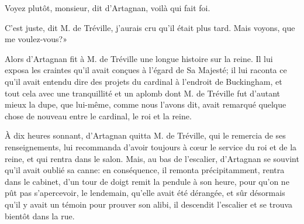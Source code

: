 \speak  Voyez plutôt, monsieur, dit d'Artagnan, voilà qui fait foi. 

\speak  C'est juste, dit M. de Tréville, j'aurais cru qu'il était plus tard. Mais voyons, que me voulez-vous?» 

Alors d'Artagnan fit à M. de Tréville une longue histoire sur la reine. Il lui exposa les craintes qu'il avait conçues à l'égard de Sa Majesté; il lui raconta ce qu'il avait entendu dire des projets du cardinal à l'endroit de Buckingham, et tout cela avec une tranquillité et un aplomb dont M. de Tréville fut d'autant mieux la dupe, que lui-même, comme nous l'avons dit, avait remarqué quelque chose de nouveau entre le cardinal, le roi et la reine. 

À dix heures sonnant, d'Artagnan quitta M. de Tréville, qui le remercia de ses renseignements, lui recommanda d'avoir toujours à cœur le service du roi et de la reine, et qui rentra dans le salon. Mais, au bas de l'escalier, d'Artagnan se souvint qu'il avait oublié sa canne: en conséquence, il remonta précipitamment, rentra dans le cabinet, d'un tour de doigt remit la pendule à son heure, pour qu'on ne pût pas s'apercevoir, le lendemain, qu'elle avait été dérangée, et sûr désormais qu'il y avait un témoin pour prouver son alibi, il descendit l'escalier et se trouva bientôt dans la rue.